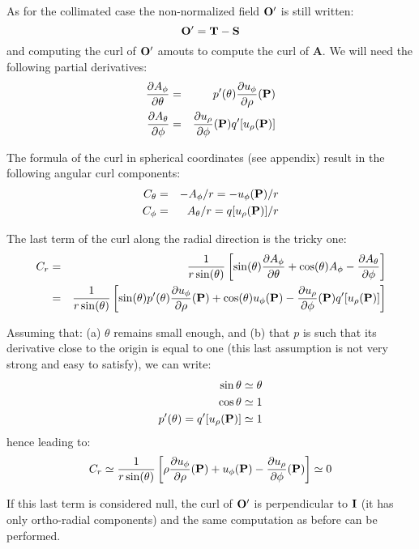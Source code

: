 As for the collimated case the non-normalized field $\mathbf{O}'$ is still written:
\[ \mathbf{O}' = \mathbf{T} - \mathbf{S} \]
and computing the curl of $\mathbf{O}'$ amouts to compute the curl of $\mathbf{A}$.
We will need the following partial derivatives:
\begin{eqnarray*}
\frac{\partial{A_\phi}}{\partial{\theta}} &=& p'(\theta)\frac{\partial{u_\phi}}{\partial{\rho}}(\mathbf{P})\\
\frac{\partial{A_\theta}}{\partial{\phi}} &=& \frac{\partial{u_\rho}}{\partial{\phi}}(\mathbf{P})q'[u_\rho(\mathbf{P})] 
\end{eqnarray*}

The formula of the curl in spherical coordinates (see appendix) result in
the following angular curl components:
\begin{eqnarray*}
C_\theta &=& -A_\phi / r = -u_\phi(\mathbf{P}) /r \\
C_\phi &=& A_\theta /r  = q[u_\rho(\mathbf{P})] /r
\end{eqnarray*}

The last term of the curl along the radial direction is the tricky one:
\begin{eqnarray*}
C_r &=& \frac{1}{r\sin(\theta)} \left[ \sin(\theta) \frac{\partial{A_\phi}}{\partial{\theta}} +
   \cos(\theta) A_\phi - \frac{\partial{A_\theta}}{\partial{\phi}} \right] \\
& =& \frac{1}{r\sin(\theta)} \left[ \sin(\theta) p'(\theta)\frac{\partial{u_\phi}}{\partial{\rho}}(\mathbf{P})
    + \cos(\theta) u_\phi(\mathbf{P}) - \frac{\partial{u_\rho}}{\partial{\phi}}(\mathbf{P})q'[u_\rho(\mathbf{P})] \right]  \\
\end{eqnarray*}

Assuming that: (a) $\theta$ remains small enough, and (b) that $p$ is such that its 
derivative close to the origin is equal to one (this last assumption is
not very strong and easy to satisfy), we can write:
\begin{eqnarray*}
\sin\theta &\simeq \theta \\
\cos\theta &\simeq 1 \\
p'(\theta) = q'[u_\rho(\mathbf{P})] &\simeq 1
\end{eqnarray*}
hence leading to:
\[ C_r \simeq \frac{1}{r\sin(\theta)} \left[ \rho \frac{\partial{u_\phi}}{\partial{\rho}}(\mathbf{P})
    +  u_\phi(\mathbf{P}) - \frac{\partial{u_\rho}}{\partial{\phi}}(\mathbf{P}) \right]  \simeq 0\]

If this last term is considered null, the curl of $\mathbf{O}'$ is perpendicular to $\mathbf{I}$
(it has only ortho-radial components) and
the same computation as before can be performed.


